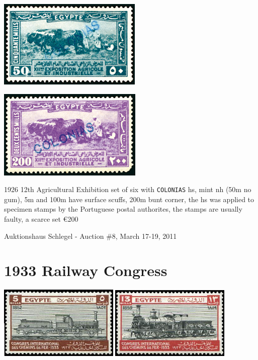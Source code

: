 \documentclass[justified]{tufte-book}
\begin{document}
\includegraphics[scale=0.8]{./graphics/EG/SG129-colonias}
\smallskip


\includegraphics[scale=0.8]{./graphics/EG/SG131-colonias}
\smallskip


1926 12th Agricultural Exhibition set of six with \texttt{COLONIAS} hs, mint nh (50m no gum), 5m and 100m have surface scuffs, 200m bunt corner, the hs was applied to specimen stamps by the Portuguese postal authorites, the stamps are usually faulty, a scarce set \euro200

Auktionshaus Schlegel - Auction \#8, March 17-19, 2011


\newpage
\section{1933 Railway Congress}


\includegraphics[width=0.43\textwidth]{./graphics/EG/Scott-168} \includegraphics[width=0.43\textwidth]{./graphics/EG/Scott-169}
\medskip
\end{document}
